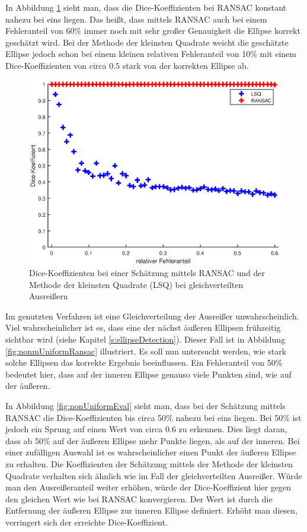 {In Abbildung \ref{fig:uniformEval} sieht man, dass die Dice-Koeffizienten bei RANSAC konstant nahezu bei eins liegen. Das heißt, dass mittels RANSAC auch bei einem Fehleranteil von 60\% immer noch mit sehr großer Genauigkeit die Ellipse korrekt geschätzt wird. Bei der Methode der kleinsten Quadrate weicht die geschätzte Ellipse jedoch schon bei einem kleinen relativen Fehleranteil von 10\% mit einem Dice-Koeffizienten von circa $0.5$ stark von der korrekten Ellipse ab.


\begin{figure}[!htb]
	\centering
	\includegraphics[width=\textwidth]{images/ransacEval0.eps}
	\caption{Dice-Koeffizienten bei einer Schätzung mittels RANSAC und der Methode der kleinsten Quadrate (LSQ) bei gleichverteilten Ausreißern}
	\label{fig:uniformEval}
\end{figure}

Im genutzten Verfahren ist eine Gleichverteilung der Ausreißer unwahrscheinlich. Viel wahrscheinlicher ist es, dass eine der nächst äußeren Ellipsen frühzeitig sichtbar wird (siehe Kapitel \ref{s:ellipseDetection}).
Dieser Fall ist in Abbildung \ref{fig:nonmUniformRansac} illustriert. Es soll nun untersucht werden, wie stark solche Ellipsen das korrekte Ergebnis beeinflussen. 
Ein Fehleranteil von 50\% bedeutet hier, dass auf der inneren Ellipse genauso viele Punkten sind, wie auf der äußeren.

In Abbildung \ref{fig:nonUniformEval} sieht man, dass bei der Schätzung mittels RANSAC die Dice-Koeffizienten bis circa 50\% nahezu bei eins liegen. Bei 50\% ist jedoch ein Sprung auf einen Wert von circa $0.6$ zu erkennen. Dies liegt daran, dass ab 50\% auf der äußeren Ellipse mehr Punkte liegen, als auf der inneren. Bei einer zufälligen Auswahl ist es wahrscheinlicher einen Punkt der äußeren Ellipse zu erhalten. Die Koeffizienten der Schätzung mittels der Methode der kleinsten Quadrate verhalten sich ähnlich wie im Fall der gleichverteilten Ausreißer. Würde man den Ausreißeranteil weiter erhöhen, würde der Dice-Koeffizient hier gegen den gleichen Wert wie bei RANSAC konvergieren. Der Wert ist durch die Entfernung der äußeren Ellipse zur inneren Ellipse definiert. Erhöht man diesen, verringert sich der erreichte Dice-Koeffizient.

}
